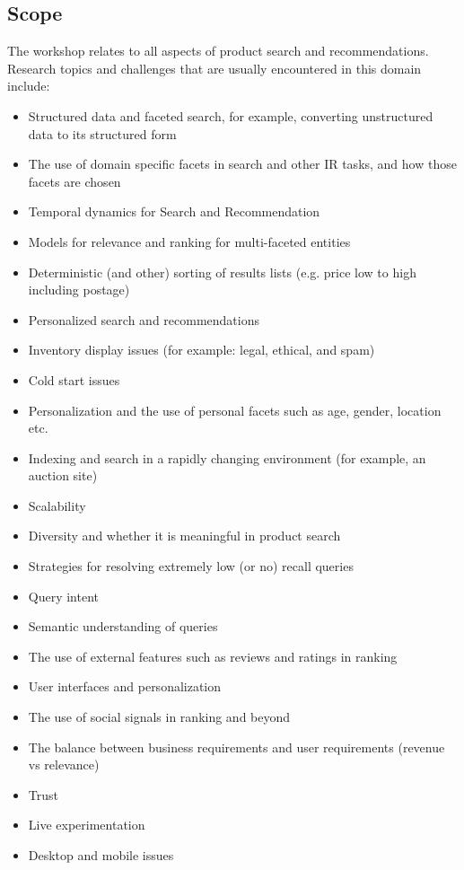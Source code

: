 \documentclass{acmart}
\begin{document}
\subsection{Scope} The workshop relates to all aspects of product search and
recommendations. Research topics and challenges that are
usually encountered in this domain include:

\begin{itemize}
\item Structured data and faceted search, for example, converting unstructured data to its structured form
\item The use of domain specific facets in search and other IR tasks, and how those facets are chosen
\item Temporal dynamics for Search and Recommendation
\item Models for relevance and ranking for multi-faceted entities
\item Deterministic (and other) sorting of results lists (e.g. price low to high including postage)
\item Personalized search and recommendations
\item Inventory display issues (for example: legal, ethical, and spam)
\item Cold start issues
\item Personalization and the use of personal facets such as age, gender, location etc.
\item Indexing and search in a rapidly changing environment (for example, an auction site)
\item Scalability
\item Diversity and whether it is meaningful in product search
\item Strategies for resolving extremely low (or no) recall queries
\item Query intent
\item Semantic understanding of queries
\item The use of external features such as reviews and ratings in ranking
\item User interfaces and personalization
\item The use of social signals in ranking and beyond
\item The balance between business requirements and user requirements (revenue vs relevance)
\item Trust
\item Live experimentation 
\item Desktop and mobile issues
\end{itemize}
\end{document}

